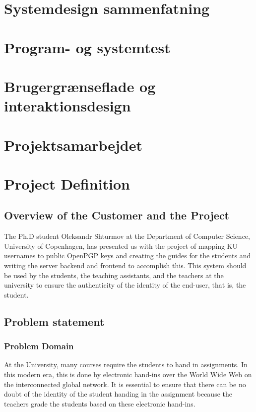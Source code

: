 \documentclass[11pt,a4paper]{report}
\begin{document}
\section{Systemdesign sammenfatning}

\section{Program- og systemtest}

\section{Brugergrænseflade og interaktionsdesign}

\section{Projektsamarbejdet}

\section{Project Definition}
\subsection{Overview of the Customer and the Project}
The Ph.D student Oleksandr Shturmov at the Department of Computer Science, University of Copenhagen, has presented us with the project of mapping KU usernames to public OpenPGP keys and creating the guides for the students and writing the server backend and frontend to accomplish this. This system should be used by the students, the teaching assistants, and the teachers at the university to ensure the authenticity of the identity of the end-user, that is, the student.
\subsection{Problem statement}
\subsubsection{Problem Domain}
At the University, many courses require the students to hand in assignments. In this modern era, this is done by electronic hand-ins over the World Wide Web on the interconnected global network. It is essential to ensure that there can be no doubt of the identity of the student handing in the assignment because the teachers grade the students based on these electronic hand-ins.
\end{document}
